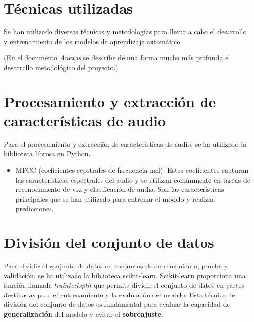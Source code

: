 \section{Técnicas utilizadas}

Se han utilizado diversas técnicas y metodologías para llevar a cabo el desarrollo y entrenamiento de los modelos de aprendizaje automático.

(En el documento \textit{Anexos} se describe de una forma mucho más profunda el desarrollo metodológico del proyecto.)

\section{Procesamiento y extracción de características de audio}

Para el procesamiento y extracción de características de audio, se ha utilizado la biblioteca librosa en Python.

\begin{itemize}
\item MFCC (coeficientes cepstrales de frecuencia mel): Estos coeficientes capturan las características espectrales del audio y se utilizan comúnmente en tareas de reconocimiento de voz y clasificación de audio. Son las características principales que se han utilizado para entrenar el modelo y realizar predicciones.
\end{itemize}

\section{División del conjunto de datos}

Para dividir el conjunto de datos en conjuntos de entrenamiento, prueba y validación, se ha utilizado la biblioteca scikit-learn. 
Scikit-learn proporciona una función llamada \textit{train\textunderscore test\textunderscore split} que permite dividir el conjunto de datos en partes destinadas para el entrenamiento y la evaluación del modelo. Esta técnica de división del conjunto de datos es fundamental para evaluar la capacidad de \textbf{generalización} del modelo y evitar el \textbf{sobreajuste}.

